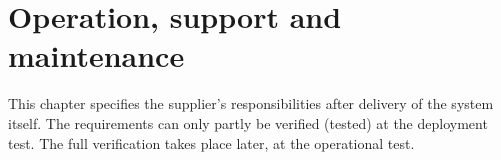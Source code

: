 \documentclass[Main]{subfiles}
\begin{document}
\chapter{Operation, support and maintenance}

This chapter specifies the supplier's responsibilities after delivery of the system itself. 
The requirements can only partly be verified (tested) at the deployment test. 
The full verification takes place later, at the operational test.




%
%


\end{document}
